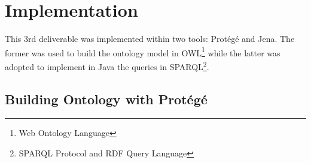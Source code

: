 \documentclass[a4paper,10pt]{article}
\begin{document}
\section{Implementation}

This 3rd deliverable was implemented within two tools: Protégé\cite{protege} and Jena\cite{jena}. The former was used to build the ontology model in OWL\footnote{Web Ontology Language} while the latter was adopted to implement in Java the queries in SPARQL\footnote{SPARQL Protocol and RDF Query Language}.

\subsection{Building Ontology with Protégé}




\end{document}
